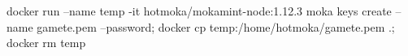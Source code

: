 \begin{shellcommandbox}\begin{ttlst}
docker run --name temp -it hotmoka/mokamint-node:1.12.3 moka keys create --name gamete.pem --password; docker cp temp:/home/hotmoka/gamete.pem .; docker rm temp
\end{ttlst}\end{shellcommandbox}
